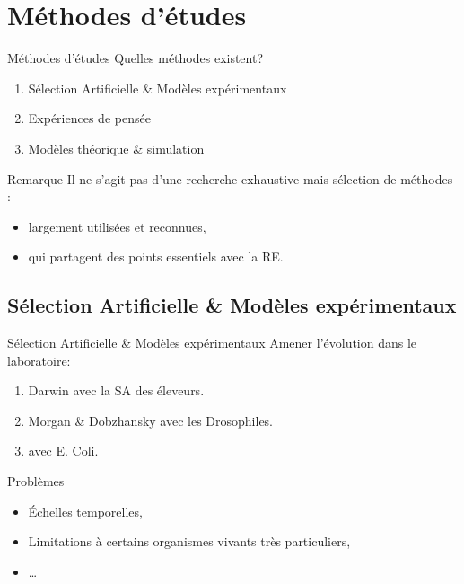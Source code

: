 \documentclass[8pt, handout=show,notes=show]{beamer}
\begin{document}
\section{Méthodes d'études}

\begin{frame}{Méthodes d'études}
	Quelles méthodes existent? 
	\begin{enumerate}
		\item Sélection Artificielle \& Modèles expérimentaux 
		\item Expériences de pensée
		\item Modèles théorique \&  simulation
	\end{enumerate}
	\vfill

	\begin{exampleblock}{Remarque}
		Il ne s'agit pas d'une recherche exhaustive mais sélection de méthodes :
		\begin{itemize}
			\item largement utilisées et reconnues,
			\item qui partagent des points essentiels avec la RE.
		\end{itemize}
	\end{exampleblock}
\end{frame}
\subsection{Sélection Artificielle \& Modèles expérimentaux}
\begin{frame}{Sélection Artificielle \& Modèles expérimentaux}
	Amener l'évolution dans le laboratoire:
	\begin{enumerate}
		\item Darwin avec la SA des éleveurs.
		\item Morgan \& Dobzhansky avec les Drosophiles.
		\item \cite{lenski94dynamicsadaptationdiversification10000generationexperimentbacterialpopulations} avec E. Coli.
	\end{enumerate}
	\vfill
	\begin{alertblock}{Problèmes}
		\begin{itemize}
			\item \'Echelles temporelles,
			\item Limitations à certains organismes vivants très particuliers,
			\item\ldots
		\end{itemize}

	\end{alertblock}

\end{frame}
\end{document}
